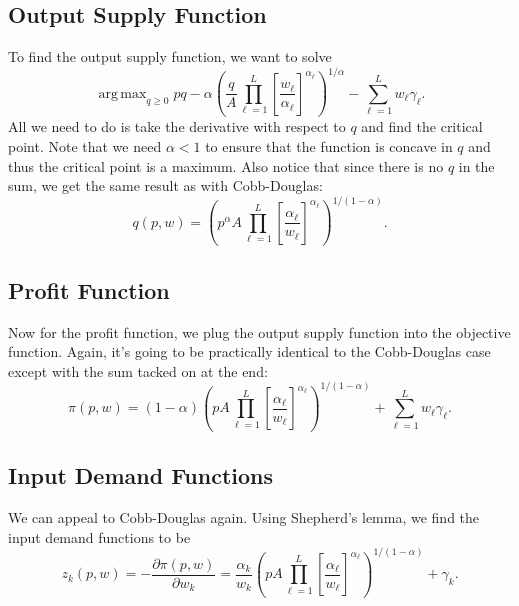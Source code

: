 \documentclass[12pt]{article}
\DeclareMathOperator*{\argmax}{arg\,max}
\theoremstyle{definition}
\begin{document}
\subsection{Output Supply Function}

To find the output supply function, we want to solve
	\[\argmax_{q\geq0} pq -  \alpha  \left(\frac{q}{A}  \prod_{\ell=1}^L \left[\frac{w_{\ell}}{\alpha_{\ell}}\right]^{\alpha_{\ell}}\right)^{1 / \alpha} - \sum_{\ell=1}^L w_{\ell}\gamma_{\ell}.	\]
All we need to do is take the derivative with respect to $q$ and find the critical point. Note that we need $\alpha < 1$ to ensure that the function is concave in $q$ and thus the critical point is a maximum. Also notice that since there is no $q$ in the sum, we get the same result as with Cobb-Douglas:
	\[q(p,w) = \left(p^{\alpha} A \prod_{\ell=1}^L \left[ \frac{\alpha_{\ell}}{w_{\ell}} \right]^{\alpha_{\ell}} \right)^{1 / (1 - \alpha)}.	\]
	
\subsection{Profit Function} 
Now for the profit function, we plug the output supply function into the objective function. Again, it's going to be practically identical to the Cobb-Douglas case except with the sum tacked on at the end:
	\[ \pi(p,w) = (1 - \alpha) \left( pA \prod_{\ell=1}^L \left[ \frac{\alpha_{\ell}}{w_{\ell} }\right]^{\alpha_{\ell}} \right)^{1 / (1 - \alpha)} +  \sum_{\ell=1}^L w_{\ell}\gamma_{\ell}. \]
	

\subsection{Input Demand Functions}
We can appeal to Cobb-Douglas again. Using Shepherd's lemma, we find the input demand functions to be
	\[z_{k}(p,w) =-\frac{\partial \pi(p,w)}{\partial w_k} = \frac{\alpha_k}{w_k}	 \left( pA \prod_{\ell=1}^L \left[ \frac{\alpha_{\ell}}{w_{\ell} }\right]^{\alpha_{\ell}} \right)^{1 / (1 - \alpha)} + \gamma_k. \]






 
\end{document}
